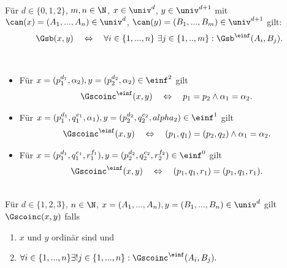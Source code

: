 \begin{dfn}[$\Gsb$]\ \\
    Für $d \in \{0,1,2\}$, $m,n \in \N$, $x \in \univ^d$, $y \in \univ^{d+1}$ mit $\can(x) = (A_1, ..., A_n) \in \univ^d$, $\can(y) = (B_1, ..., B_m) \in \univ^{d+1}$ gilt:
    \begin{align*}
        \Gsb(x,y) \quad \Leftrightarrow \quad \forall i \in \{1, ..., n\}\ \exists j \in \{1, .., m\}: \Gsb^\einf(A_i,B_j).
    \end{align*}
\end{dfn}


\begin{dfn}[$\Gscoinc^\einf$]\ 
    \begin{itemize}
        \item Für $x = (p_1^{d_1},\alpha_2), y = (p_2^{d_2},\alpha_2) \in \einf^2$ gilt
            \begin{align*}
                \Gscoinc^\einf(x,y) 
                \quad \Leftrightarrow \quad 
                p_1 = p_2 \land \alpha_1 = \alpha_2.
            \end{align*}
        \item Für $x = (p_1^{d_1},q_1^{e_1},\alpha_1), y = (p_2^{d_2},q_2^{e_2},alpha_2) \in \einf^1$ gilt
            \begin{align*}
                \Gscoinc^\einf(x,y) 
                \quad \Leftrightarrow \quad 
                (p_1, q_1) = (p_2,q_2) \land \alpha_1 = \alpha_2.
            \end{align*}
        \item Für $x = (p_1^{d_1},q_1^{e_1},r_1^{f_1}), y = (p_2^{d_2},q_2^{e_2},r_2^{f_2}) \in \einf^0$ gilt
            \begin{align*}
                \Gscoinc^\einf(x,y) 
                \quad \Leftrightarrow \quad 
                (p_1,q_1,r_1) = (p_1,q_1,r_1).
            \end{align*}
    \end{itemize}
\end{dfn}


\begin{dfn}[$\Gscoinc$]\ \\
    Für $d \in \{1,2,3\}$, $n \in \N$, $x=(A_1, ... , A_n), y=(B_1, ..., B_n) \in \univ^d$ gilt $\Gscoinc(x,y)$ falls
    \begin{enumerate}
     \item $x$ und $y$ ordinär sind und
     \item $\forall i \in \{1, ..., n\} \exists! j \in \{1, ..., n\} : \Gscoinc^\einf(A_i,B_j).$
    \end{enumerate}
\end{dfn}


